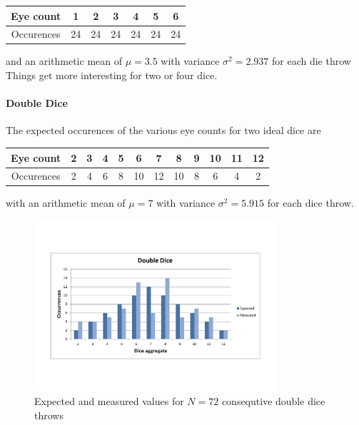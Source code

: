 \documentclass{scrreprt}
\begin{document}
\begin{center}
    \begin{tabular}{|c|cccccc|}
    \hline
    Eye count & 1 & 2 & 3 & 4 & 5 & 6\\
    \hline
    Occurences & 24 & 24 & 24 & 24 & 24 & 24\\
    \hline
    \end{tabular}
\end{center}
and an arithmetic mean of $\mu = 3.5$ with variance $\sigma^2 = 2.937$ for each die throw\\

Things get more interesting for two or four dice.

\paragraph{Double Dice}
The expected occurences of the various eye counts for two ideal dice are
\begin{center}
    \begin{tabular}{|c|ccccccccccc|}
    \hline
    Eye count & 2 & 3 & 4 & 5 & 6 & 7 & 8 & 9 & 10 & 11 & 12\\
    \hline
    Occurences & 2 & 4 & 6 & 8 & 10 & 12 & 10 & 8 & 6 & 4 & 2\\
    \hline
    \end{tabular}
\end{center}

with an arithmetic mean of $\mu = 7$ with variance $\sigma^2 = 5.915$ for each dice throw.

\begin{figure}[H]
    \center   
        \includegraphics[width=0.8\textwidth]{img/double_dice_combo.pdf}
        \caption{Expected and measured values for $N=72$ consequtive double dice throws}
\end{figure}
\end{document}
